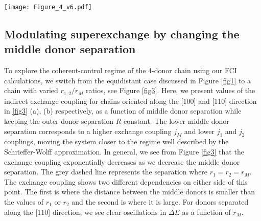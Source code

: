 \documentclass[%
showkeys,
 amsmath,amssymb,
 aps,
prb,
]{revtex4-2}
\begin{document}
\begin{figure*}[htb!]
    \centering
    \texttt{[image: Figure\_4\_v6.pdf]}
    \caption{\textbf{Exchange coupling as a function of different middle donor separations, $r_M$.} The exchange coupling $\Delta E$ is calculated using atomistic FCI for different separations of the middle donors $r_M$ in the (a) [100] and (b) [110] direction while keeping the total outer qubit separation fixed (R = 29.3274 nm for [100] and R = 27.648 nm for [110]). The system is symmetric ($r_1$ $=$ $r_2$) to the end donors. The results show that the dependence of exchange energy changes on either side of the equidistant separation (dashed grey line) for all donors. The dashed line indicates where $r_1$ = $r_2$ = $r_M$ and the left region of this line where $r_1
    $ $=$ $r_2$ $>$ $r_M$ is where the two middle donors form a singlet state and the exchange coupling between the end donors is termed superexchange. We compare our FCI results with the effective spin Hamiltonian, $H_{eff}$ of Eq. \ref{Heff} with $j_{1,2}$ and $j_M$ extracted from \cite{wangHighlyTunableExchange2016a}. For both cases, the results show reasonable agreement with each other. We attribute any differences mainly to the fact that the total confinement potential of 4 donors is deeper than that of 2 donors which results in a slightly higher exchange coupling $\Delta E$ in our atomistic FCI calculations.}
    \label{fig3}
\end{figure*}

\subsection{Modulating superexchange by changing the middle donor separation}
To explore the coherent-control regime of the 4-donor chain using our FCI calculations, we switch from the equidistant case discussed in Figure \ref{fig1} to a chain with varied $r_{1,2}/r_M$ ratios, see Figure \ref{fig3}. Here, we present values of the indirect exchange coupling for chains oriented along the [100] and [110] direction in \ref{fig3} (a), (b) respectively, as a function of middle donor separation while keeping the outer donor separation $R$ constant. The lower middle donor separation corresponds to a higher exchange coupling $j_M$ and lower $j_1$ and $j_2$ couplings, moving the system closer to the regime well described by the Schrieffer-Wolff approximation. In general, we see from Figure \ref{fig3} that the exchange coupling exponentially decreases as we decrease the middle donor separation. The grey dashed line represents the separation where $r_1=r_2=r_M$. The exchange coupling shows two different dependencies on either side of this point. The first is where the distance between the middle donors is smaller than the values of $r_1$ or $r_2$ and the second is where it is large. For donors separated along the [110] direction, we see clear oscillations in $\Delta E$ as a function of $r_M$. 
\end{document}
